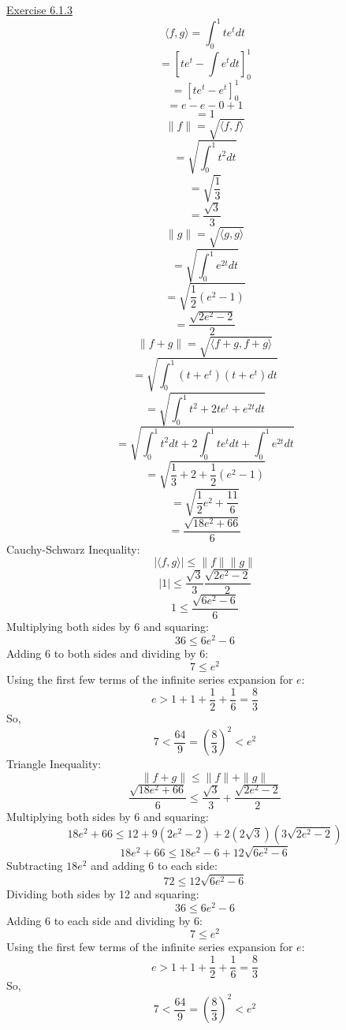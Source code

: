 \documentclass{exam}
\begin{document}
\underline{Exercise 6.1.3}
\newline
\newline
\[\langle f,g\rangle=\int_{0}^{1}te^tdt\]
\[=\left[te^t-\int e^tdt\right]_0^1\]
\[=\left[te^t-e^t\right]_0^1\]
\[=e-e-0+1\]
\[=1\]
\newline
\[\|f\|=\sqrt{\langle f,f\rangle}\]
\[=\sqrt{\int_{0}^{1}t^2dt}\]
\[=\sqrt{\frac{1}{3}}\]
\[=\frac{\sqrt{3}}{3}\]
\newline
\[\|g\|=\sqrt{\langle g,g\rangle}\]
\[=\sqrt{\int_{0}^{1}e^{2t}dt}\]
\[=\sqrt{\frac{1}{2}(e^2-1)}\]
\[=\frac{\sqrt{2e^2-2}}{2}\]
\newline
\[\|f+g\|=\sqrt{\langle f+g,f+g\rangle}\]
\[=\sqrt{\int_{0}^{1}(t+e^t)(t+e^t)dt}\]
\[=\sqrt{\int_{0}^{1}t^2+2te^t+e^{2t}dt}\]
\[=\sqrt{\int_{0}^{1}t^2dt+2\int_{0}^{1}te^tdt+\int_{0}^{1}e^{2t}dt}\]
\[=\sqrt{\frac{1}{3}+2+\frac{1}{2}(e^2-1)}\]
\[=\sqrt{\frac{1}{2}e^2+\frac{11}{6}}\]
\[=\frac{\sqrt{18e^2+66}}{6}\]
\newline
Cauchy-Schwarz Inequality:
\[|\langle f,g\rangle|\le\|f\|\|g\|\]
\[|1|\le\frac{\sqrt{3}}{3}\frac{\sqrt{2e^2-2}}{2}\]
\[1\le\frac{\sqrt{6e^2-6}}{6}\]
Multiplying both sides by 6 and squaring:
\[36\le6e^2-6\]
Adding 6 to both sides and dividing by 6:
\[7\le e^2\]
Using the first few terms of the infinite series expansion for $e$:
\[e>1+1+\frac{1}{2}+\frac{1}{6}=\frac{8}{3}\]
So,
\[7<\frac{64}{9}=\left(\frac{8}{3}\right)^2<e^2\]
\newline
Triangle Inequality:
\[\|f+g\|\le\|f\|+\|g\|\]
\[\frac{\sqrt{18e^2+66}}{6}\le\frac{\sqrt{3}}{3}+\frac{\sqrt{2e^2-2}}{2}\]
Multiplying both sides by 6 and squaring:
\[18e^2+66\le12+9(2e^2-2)+2(2\sqrt{3})(3\sqrt{2e^2-2})\]
\[18e^2+66\le18e^2-6+12\sqrt{6e^2-6}\]
Subtracting $18e^2$ and adding 6 to each side:
\[72\le12\sqrt{6e^2-6}\]
Dividing both sides by 12 and squaring:
\[36\le6e^2-6\]
Adding 6 to each side and dividing by 6:
\[7\le e^2\]
Using the first few terms of the infinite series expansion for $e$:
\[e>1+1+\frac{1}{2}+\frac{1}{6}=\frac{8}{3}\]
So,
\[7<\frac{64}{9}=\left(\frac{8}{3}\right)^2<e^2\]
\newline
\end{document}
